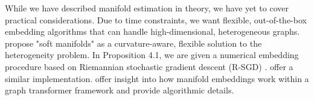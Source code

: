 \documentclass[twoside,11pt]{article}
\begin{document}
While we have described manifold estimation in theory, we have yet to cover practical considerations. Due to time constraints, we want flexible, out-of-the-box embedding algorithms that can handle high-dimensional, heterogeneous graphs.  \citet{digiovanni_etal_2022} propose "soft manifolds" as a curvature-aware, flexible solution to the heterogeneity problem. In \citet{digiovanni_etal_2022} Proposition 4.1, we are given a numerical embedding procedure based on Riemannian stochastic gradient descent (R-SGD) \citep{bonnabel_2013}. \citet{marinoni_etal_2023} offer a similar implementation. \citet{jyothish_jannesari_2025} offer insight into how manifold embeddings work within a graph transformer framework and provide algorithmic details. 


\newpage 


\end{document}

